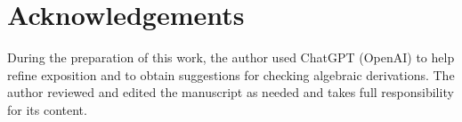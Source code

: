 \documentclass[sn-mathphys-ay]{sn-jnl}
\theoremstyle{plain}
\theoremstyle{remark}
\begin{document}
\setlength{\emergencystretch}{2em}
\maketitle













\appendix




\section*{Acknowledgements}
During the preparation of this work, the author used ChatGPT (OpenAI) to help
refine exposition and to obtain suggestions for checking algebraic
derivations. The author reviewed and edited the manuscript as needed and takes
full responsibility for its content.
\end{document}
